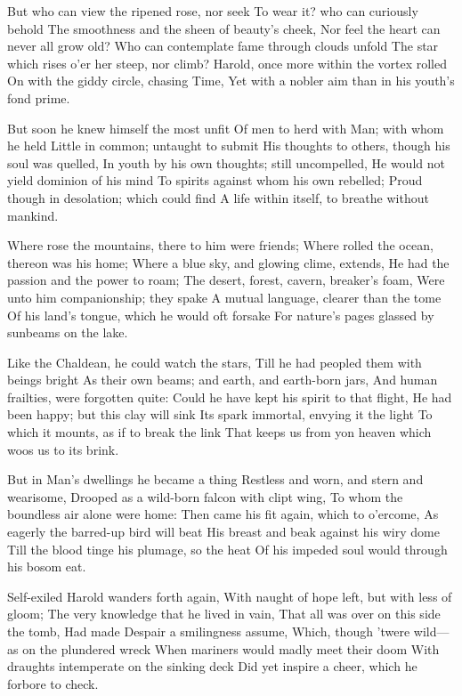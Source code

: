 \documentclass[10pt,twocolumn]{book}
\begin{document}
   But who can view the ripened rose, nor seek
   To wear it? who can curiously behold
   The smoothness and the sheen of beauty's cheek,
   Nor feel the heart can never all grow old?
   Who can contemplate fame through clouds unfold
   The star which rises o'er her steep, nor climb?
   Harold, once more within the vortex rolled
   On with the giddy circle, chasing Time,
Yet with a nobler aim than in his youth's fond prime.


   But soon he knew himself the most unfit
   Of men to herd with Man; with whom he held
   Little in common; untaught to submit
   His thoughts to others, though his soul was quelled,
   In youth by his own thoughts; still uncompelled,
   He would not yield dominion of his mind
   To spirits against whom his own rebelled;
   Proud though in desolation; which could find
A life within itself, to breathe without mankind.


   Where rose the mountains, there to him were friends;
   Where rolled the ocean, thereon was his home;
   Where a blue sky, and glowing clime, extends,
   He had the passion and the power to roam;
   The desert, forest, cavern, breaker's foam,
   Were unto him companionship; they spake
   A mutual language, clearer than the tome
   Of his land's tongue, which he would oft forsake
For nature's pages glassed by sunbeams on the lake.


   Like the Chaldean, he could watch the stars,
   Till he had peopled them with beings bright
   As their own beams; and earth, and earth-born jars,
   And human frailties, were forgotten quite:
   Could he have kept his spirit to that flight,
   He had been happy; but this clay will sink
   Its spark immortal, envying it the light
   To which it mounts, as if to break the link
That keeps us from yon heaven which woos us to its brink.


   But in Man's dwellings he became a thing
   Restless and worn, and stern and wearisome,
   Drooped as a wild-born falcon with clipt wing,
   To whom the boundless air alone were home:
   Then came his fit again, which to o'ercome,
   As eagerly the barred-up bird will beat
   His breast and beak against his wiry dome
   Till the blood tinge his plumage, so the heat
Of his impeded soul would through his bosom eat.


   Self-exiled Harold wanders forth again,
   With naught of hope left, but with less of gloom;
   The very knowledge that he lived in vain,
   That all was over on this side the tomb,
   Had made Despair a smilingness assume,
   Which, though 'twere wild---as on the plundered wreck
   When mariners would madly meet their doom
   With draughts intemperate on the sinking deck\textemdash
Did yet inspire a cheer, which he forbore to check.
\end{document}
